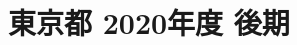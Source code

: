 \documentclass[../../hsm_tok_q.tex]{subfiles}
\begin{document}
    \section{東京都 2020年度 後期}
    \subsection{　}
    
    \newpage
    \subsection{　}
    
    \newpage
    \subsection{　}
    
    \newpage
    \subsection{　}
    
    \newpage
    \subsection{　}
    
\end{document}
